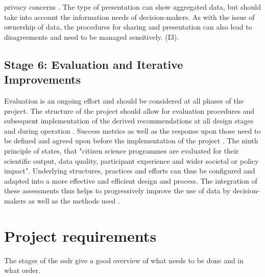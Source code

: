 privacy concerns \autocite{escaeuropeancitizenscienceassociationTenPrinciplesCitizen2015,sharpeCommunityBasedEcological2006}. The type of presentation can show aggregated data, but should take into account the information needs of decision-makers. As with the issue of ownership of data, the procedures for sharing and presentation can also lead to disagreements and need to be  managed sensitively. (I3)\autocite{ifrcCommunityBasedSurveillanceGuiding2017}.

\subsection{Stage 6: Evaluation and Iterative Improvements}\label{subsec:stage6_design}

Evaluation is an ongoing effort and should be considered at all phases of the project. The structure of the project should allow for evaluation procedures and subsequent implementation of the derived recommendations at all design stages and during operation \autocite{fraislCitizenScienceEnvironmental2022,ifrcCommunityBasedSurveillanceGuiding2017}. Success metrics as well as the response upon those need to be defined and agreed upon before the implementation of the project \autocite{fraislCitizenScienceEnvironmental2022,gualazziniEWEAEarlyWarning2021}. The ninth principle of \autocite{escaeuropeancitizenscienceassociationTenPrinciplesCitizen2015} states, that "citizen science programmes are evaluated for their scientific output, data quality, participant experience and wider societal or policy impact". Underlying structures, practices and efforts can thus be configured and adapted into a more effective and efficient design and process. The integration of these assessments thus helps to progressively improve the use of data by decision-makers as well as the methods used \autocite{fraislCitizenScienceEnvironmental2022}.


\section{Project requirements}\label{sec:project_requirements}

The stages of the \acrshort{ssdr} give a good overview of what needs to be done and in what order. 

